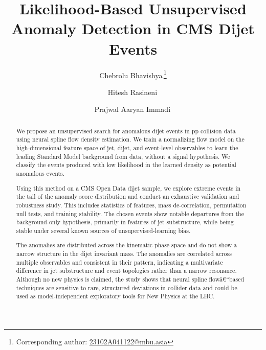 \documentclass[11pt,a4paper,twocolumn]{article}
\date{}
\begin{document}
\title{Likelihood-Based Unsupervised Anomaly Detection in CMS Dijet Events}

\author[2,$\dagger$]{Chebrolu Bhavishya\,\thanks{Corresponding author: \url{23102A041122@mbu.asia}}}
\author[1,$\dagger$]{Hitesh Rasineni\,}
\author[1,$\dagger$]{Prajwal Aaryan Immadi\,}


\maketitle

\begingroup
\renewcommand{\thefootnote}{\fnsymbol{footnote}}
\endgroup
\begin{abstract}
We propose an unsupervised search for anomalous dijet events in pp collision data using neural spline flow density estimation. We train a normalizing flow model on the high-dimensional feature space of jet, dijet, and event-level observables to learn the leading Standard Model background from data, without a signal hypothesis. We classify the events produced with low likelihood in the learned density as potential anomalous events.

Using this method on a CMS Open Data dijet sample, we explore extreme events in the tail of the anomaly score distribution and conduct an exhaustive validation and robustness study. This includes statistics of features, mass de-correlation, permutation null tests, and training stability. The chosen events show notable departures from the background-only hypothesis, primarily in features of jet substructure, while being stable under several known sources of unsupervised-learning bias.

The anomalies are distributed across the kinematic phase space and do not show a narrow structure in the dijet invariant mass. The anomalies are correlated across multiple observables and consistent in their pattern, indicating a multivariate difference in jet substructure and event topologies rather than a narrow resonance. Although no new physics is claimed, the study shows that neural spline flowâ€“based techniques are sensitive to rare, structured deviations in collider data and could be used as model-independent exploratory tools for New Physics at the LHC.
\end{abstract}
\end{document}
